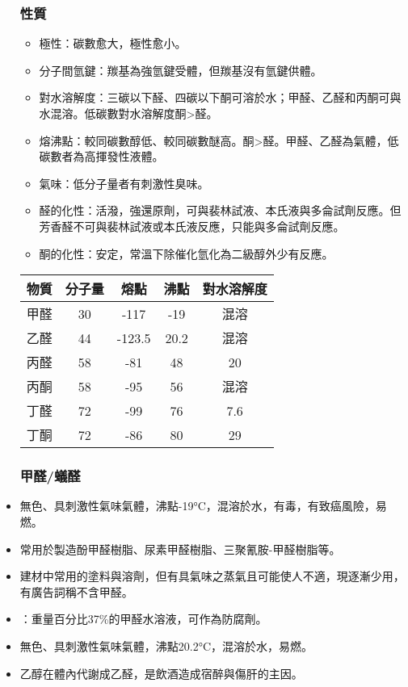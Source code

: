\documentclass[a4paper,12pt]{report}
\begin{document}
\begin{itemize}
\subsubsection{性質}
\begin{itemize}
\item 極性：碳數愈大，極性愈小。
\item 分子間氫鍵：羰基為強氫鍵受體，但羰基沒有氫鍵供體。
\item 對水溶解度：三碳以下醛、四碳以下酮可溶於水；甲醛、乙醛和丙酮可與水混溶。低碳數對水溶解度酮>醛。
\item 熔沸點：較同碳數醇低、較同碳數醚高。酮>醛。甲醛、乙醛為氣體，低碳數者為高揮發性液體。
\item 氣味：低分子量者有刺激性臭味。
\item 醛的化性：活潑，強還原劑，可與裴林試液、本氏液與多侖試劑反應。但芳香醛不可與裴林試液或本氏液反應，只能與多侖試劑反應。
\item 酮的化性：安定，常溫下除催化氫化為二級醇外少有反應。
\end{itemize}
\begin{longtable}[c]{|c|c|c|c|c|}
\hline
物質 & 分子量 & 熔點 & 沸點 & 對水溶解度\\\hline\endhead
甲醛 & 30 & -117 & -19 & 混溶\\\hline
乙醛 & 44 & -123.5 & 20.2 & 混溶\\\hline
丙醛 & 58 & -81 & 48 & 20\\\hline
丙酮 & 58 & -95 & 56 & 混溶\\\hline
丁醛 & 72 & -99 & 76 & 7.6\\\hline
丁酮 & 72 & -86 & 80 & 29\\\hline
\end{longtable}\FB
\subsubsection{甲醛/蟻醛}
\bit
\item 無色、具刺激性氣味氣體，沸點-19°C，混溶於水，有毒，有致癌風險，易燃。
\item 常用於製造酚甲醛樹脂、尿素甲醛樹脂、三聚氰胺-甲醛樹脂等。
\item 建材中常用的塗料與溶劑，但有具氣味之蒸氣且可能使人不適，現逐漸少用，有廣告詞稱不含甲醛。
\item {}：重量百分比37\%的甲醛水溶液，可作為防腐劑。
\eit
{}
\bit
\item 無色、具刺激性氣味氣體，沸點20.2°C，混溶於水，易燃。
\item 乙醇在體內代謝成乙醛，是飲酒造成宿醉與傷肝的主因。
\eit

\end{itemize}
\end{document}
